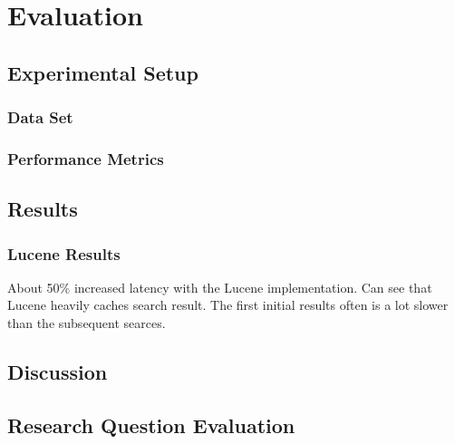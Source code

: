 \chapter{Evaluation}
\label{ch:evaluation}

\section{Experimental Setup}

\subsection{Data Set}
\label{sec:dataset}

\subsection{Performance Metrics}

\section{Results}
\label{sec:results}

\subsection{Lucene Results}
About 50\% increased latency with the Lucene implementation.
Can see that Lucene heavily caches search result.
The first initial results often is a lot slower than the subsequent searces.

\section{Discussion}

\section{Research Question Evaluation}
